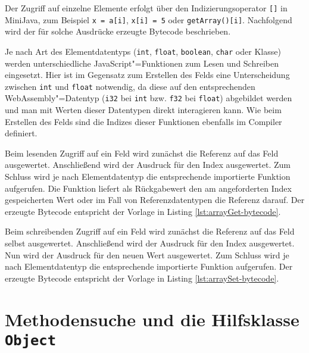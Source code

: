 Der Zugriff auf einzelne Elemente erfolgt über den Indizierungsoperator \lstinline{[]} in MiniJava, zum Beispiel \lstinline{x = a[i]}, \lstinline{x[i] = 5} oder \lstinline{getArray()[i]}. Nachfolgend wird der für solche Ausdrücke erzeugte Bytecode beschrieben.

Je nach Art des Elementdatentyps (\lstinline{int}, \lstinline{float}, \lstinline{boolean}, \lstinline{char} oder Klasse) werden unterschiedliche JavaScript"=Funktionen zum Lesen und Schreiben eingesetzt. Hier ist im Gegensatz zum Erstellen des Felds eine Unterscheidung zwischen \lstinline{int} und \lstinline{float} notwendig, da diese auf den entsprechenden WebAssembly"=Datentyp (\lstinline{i32} bei \lstinline{int} bzw. \lstinline{f32} bei \lstinline{float}) abgebildet werden und man mit Werten dieser Datentypen direkt interagieren kann. Wie beim Erstellen des Felds sind die Indizes dieser Funktionen ebenfalls im Compiler definiert.

Beim lesenden Zugriff auf ein Feld wird zunächst die Referenz auf das Feld ausgewertet. Anschließend wird der Ausdruck für den Index ausgewertet. Zum Schluss wird je nach Elementdatentyp die entsprechende importierte Funktion aufgerufen. Die Funktion liefert als Rückgabewert den am angeforderten Index gespeicherten Wert oder im Fall von Referenzdatentypen die Referenz darauf. Der erzeugte Bytecode entspricht der Vorlage in Listing \ref{lst:arrayGet-bytecode}.



Beim schreibenden Zugriff auf ein Feld wird zunächst die Referenz auf das Feld selbst ausgewertet. Anschließend wird der Ausdruck für den Index ausgewertet. Nun wird der Ausdruck für den neuen Wert ausgewertet. Zum Schluss wird je nach Elementdatentyp die entsprechende importierte Funktion aufgerufen. Der erzeugte Bytecode entspricht der Vorlage in Listing \ref{lst:arraySet-bytecode}.

\pagebreak


\section{Methodensuche und die Hilfsklasse \lstinline{Object}}

